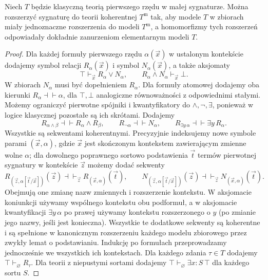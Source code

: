 \begin{stwierdzenie}\label{cat:prop:cl-morleyization}
Niech $T$ będzie klasyczną teorią pierwszego rzędu w małej sygnaturze. Można rozszerzyć sygnaturę do teorii koherentnej $T^{\mathrm m}$ tak, aby modele $T$ w zbiorach miały jednoznaczne rozszerzenia do modeli $T^{\mathrm m}$, a homomorfizmy tych rozszerzeń odpowiadały dokładnie zanurzeniom elementarnym modeli $T$.
\end{stwierdzenie}
\begin{proof}
Dla każdej formuły pierwszego rzędu $\alpha(\vec x)$ w ustalonym kontekście dodajemy symbol relacji $R_\alpha(\vec x)$ i symbol $N_\alpha(\vec x)$, a także aksjomaty
\[
 \top\vdash_{\vec x}R_\alpha\vee N_\alpha,\qquad
 R_\alpha\wedge N_\alpha\vdash_{\vec x}\bot.
\]
W zbiorach $N_\alpha$ musi być dopełnieniem $R_\alpha$. Dla formuły atomowej dodajemy oba kierunki $R_\alpha\dashv\vdash\alpha$, dla $\top,\bot$ analogiczne równoważności z odpowiednimi stałymi. Możemy ograniczyć pierwotne spójniki i kwantyfikatory do $\wedge,\neg,\exists$, ponieważ w logice klasycznej pozostałe są ich skrótami. Dodajemy
\[
 R_{\alpha\wedge\beta}\dashv\vdash R_\alpha\wedge R_\beta,\qquad
 R_{\neg\alpha}\dashv\vdash N_\alpha,\qquad
 R_{\exists y\,\alpha}\dashv\vdash\exists y\,R_\alpha.
\]
Wszystkie są sekwentami koherentnymi. Precyzyjnie indeksujemy nowe symbole parami $(\vec x,\alpha)$, gdzie $\vec x$ jest skończonym kontekstem zawierającym zmienne wolne $\alpha$; dla dowolnego poprawnego sortowo podstawienia $\vec t$ termów pierwotnej sygnatury w kontekście $\vec z$ możemy dodać sekwenty
\[
 R_{(\vec z,\alpha[\vec t/\vec x])}(\vec z)
 \dashv\vdash_{\vec z}R_{(\vec x,\alpha)}(\vec t),
 \qquad
 N_{(\vec z,\alpha[\vec t/\vec x])}(\vec z)
 \dashv\vdash_{\vec z}N_{(\vec x,\alpha)}(\vec t).
\]
Obejmują one zmianę nazw zmiennych i rozszerzenie kontekstu. W aksjomacie koniunkcji używamy wspólnego kontekstu obu podformuł, a w aksjomacie kwantyfikacji $\exists y\,\alpha$ po prawej używamy kontekstu rozszerzonego o $y$ (po zmianie jego nazwy, jeśli jest konieczna). Wszystkie te dodatkowe sekwenty są koherentne i są spełnione w kanonicznym rozszerzeniu każdego modelu zbiorowego przez zwykły lemat o podstawianiu. Indukcję po formułach przeprowadzamy jednocześnie we wszystkich ich kontekstach. Dla każdego zdania $\tau\in T$ dodajemy $\top\vdash_{\varnothing}R_\tau$. Dla teorii z niepustymi sortami dodajemy $\top\vdash_{\varnothing}\exists x:S\,\top$ dla każdego sortu $S$.


\end{proof}
